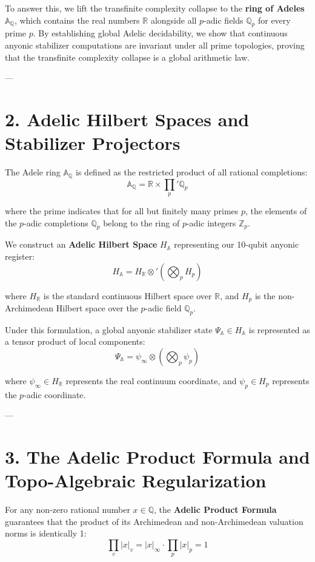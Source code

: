 \documentclass[11pt,twocolumn]{article}
\begin{document}
To answer this, we lift the transfinite complexity collapse to the \textbf{ring of Adeles} $\mathbb{A}_{\mathbb{Q}}$, which contains the real numbers $\mathbb{R}$ alongside all $p$-adic fields $\mathbb{Q}_p$ for every prime $p$. By establishing global Adelic decidability, we show that continuous anyonic stabilizer computations are invariant under all prime topologies, proving that the transfinite complexity collapse is a global arithmetic law.

---

\section{2. Adelic Hilbert Spaces and Stabilizer Projectors}
The Adele ring $\mathbb{A}_{\mathbb{Q}}$ is defined as the restricted product of all rational completions:
$$\mathbb{A}_{\mathbb{Q}} = \mathbb{R} \times \prod_{p}' \mathbb{Q}_p$$

where the prime indicates that for all but finitely many primes $p$, the elements of the $p$-adic completions $\mathbb{Q}_p$ belong to the ring of $p$-adic integers $\mathbb{Z}_p$. 

We construct an \textbf{Adelic Hilbert Space} $H_{\mathbb{A}}$ representing our 10-qubit anyonic register:
$$H_{\mathbb{A}} = H_{\mathbb{R}} \otimes' \left( \bigotimes_p H_p \right)$$

where $H_{\mathbb{R}}$ is the standard continuous Hilbert space over $\mathbb{R}$, and $H_p$ is the non-Archimedean Hilbert space over the $p$-adic field $\mathbb{Q}_p$. 

Under this formulation, a global anyonic stabilizer state $\Psi_{\mathbb{A}} \in H_{\mathbb{A}}$ is represented as a tensor product of local components:
$$\Psi_{\mathbb{A}} = \psi_{\infty} \otimes \left( \bigotimes_p \psi_p \right)$$

where $\psi_{\infty} \in H_{\mathbb{R}}$ represents the real continuum coordinate, and $\psi_p \in H_p$ represents the $p$-adic coordinate.

---

\section{3. The Adelic Product Formula and Topo-Algebraic Regularization}
For any non-zero rational number $x \in \mathbb{Q}$, the \textbf{Adelic Product Formula} guarantees that the product of its Archimedean and non-Archimedean valuation norms is identically 1:
$$\prod_{v} |x|_v = |x|_{\infty} \cdot \prod_{p} |x|_p = 1$$
\end{document}

